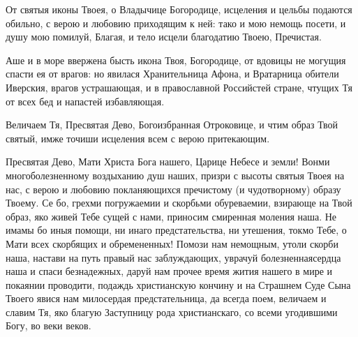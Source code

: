 \begin{mymulticols}



От святыя иконы Твоея, о Владычице Богородице, исцеления и цельбы подаются обильно, с верою и любовию приходящим к ней: тако и мою немощь посети, и душу мою помилуй, Благая, и тело исцели благодатию Твоею, Пречистая.


Аше и в море ввержена бысть икона Твоя, Богородице, от вдовицы не могущия спасти ея от врагов: но явилася Хранительница Афона, и Вратарница обители Иверския, врагов устрашающая, и в православной Российстей стране, чтущих Тя от всех бед и напастей избавляющая.


Величаем Тя, Пресвятая Дево, Богоизбранная Отроковице, и чтим образ Твой святый, имже точиши исцеления всем с верою притекающим.


{ Пресвятая Дево, Мати Христа Бога нашего, Царице Небесе и земли! Вонми многоболезненному воздыханию душ наших, призри с высоты святыя Твоея на нас, с верою и любовию покланяющихся пречистому (и чудотворному) образу Твоему. Се бо, грехми погружаемии и скорбьми обуреваемии, взирающе на Твой образ, яко живей Тебе сущей с нами, приносим смиренная моления наша. Не имамы бо иныя помощи, ни инаго предстательства, ни утешения, токмо Тебе, о Мати всех скорбящих и обремененных! Помози нам немощным, утоли скорби наша, настави на путь правый нас заблуждающих, уврачуй болезненнаясердца наша и спаси безнадежных, даруй нам прочее время жития нашего в мире и покаянии проводити, подаждь христианскую кончину и на Страшнем Суде Сына Твоего явися нам милосердая предстательница, да всегда поем, величаем и славим Тя, яко благую Заступницу рода христианскаго, со всеми угодившими Богу, во веки веков.}

\end{mymulticols}

\mychapterending

